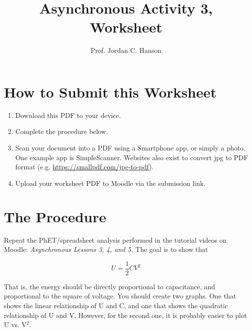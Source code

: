 \documentclass{article}
\begin{document}
\title{Asynchronous Activity 3, Worksheet}
\author{Prof. Jordan C. Hanson}

\maketitle

\section{How to Submit this Worksheet}

\begin{enumerate}
\item Download this PDF to your device.
\item Complete the procedure below.
\item Scan your document into a PDF using a Smartphone app, or simply a photo.  One example app is SimpleScanner.  Websites also exist to convert jpg to PDF format (e.g. \url{https://smallpdf.com/jpg-to-pdf}).
\item Upload your worksheet PDF to Moodle via the submission link.
\end{enumerate}

\section{The Procedure}

Repeat the PhET/spreadsheet analysis performed in the tutorial videos on Moodle: \textit{Asynchronous Lessons 3, 4, and 5.}  The goal is to show that 

\begin{equation}
U = \frac{1}{2}C V^2
\end{equation}

That is, the energy should be directly proportional to capacitance, and proportional to the square of voltage.  You should create two graphs.  One that shows the linear relationship of U and C, and one that shows the quadratic relationship of U and V.  However, for the second one, it is probably easier to plot U vs. V$^2$.
\end{document}
